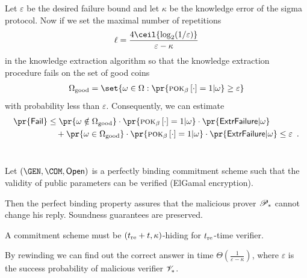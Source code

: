 \documentclass[landscape,dvips,footrule]{foils}
\begin{document}

Let $\varepsilon$ be the desired failure bound and let $\kappa$ be the
knowledge error of the sigma protocol. Now if we set the maximal
number of repetitions
\begin{align*}
  \ell=\frac{4\ceil{\log_2(1/\varepsilon)}}{\varepsilon-\kappa}
\end{align*}
in the knowledge extraction algorithm so that the knowledge extraction
procedure fails on the set of good coins
\begin{align*}
  \Omega_{\mathrm{good}}=\set{\omega\in\Omega:\pr{\pok{\beta}{\cdot}=1|\omega}\geq \varepsilon}
\end{align*}
with probability less than $\varepsilon$. Consequently, we can estimate
    \begin{align*}
      \pr{\mathsf{Fail}}%
      &\leq\pr{\omega\notin\Omega_{\mathrm{good}}}\cdot\pr{\pok{\beta}{\cdot}=1|\omega}
      \cdot \pr{\mathsf{ExtrFailure}|\omega}\\
      &\quad+\pr{\omega\in\Omega_{\mathrm{good}}}\cdot\pr{\pok{\beta}{\cdot}=1|\omega}\cdot
      \pr{\mathsf{ExtrFailure}|\omega}\leq\varepsilon\enspace.
    \end{align*}\ \vspace*{-8ex}\\





Let $(\GEN,\COM,\OPEN)$ is a perfectly binding commitment
scheme such that the validity of public parameters can be verified
(ElGamal encryption).
\begin{triangles}
\item Then the perfect binding property assures that the malicious
  prover $\mathscr{P}_*$ cannot change his reply. Soundness guarantees are
  preserved.
\item A commitment scheme must be $(t_{\mathrm{re}}+t,\kappa)$-hiding for $t_{\mathrm{re}}$-time verifier.
\item By rewinding we can find out the correct answer in time
  $\Theta(\frac{1}{\varepsilon-\kappa})$, where $\varepsilon$ is the
  success probability of malicious verifier $\mathscr{V}_*$.
\end{triangles}
\end{document}
